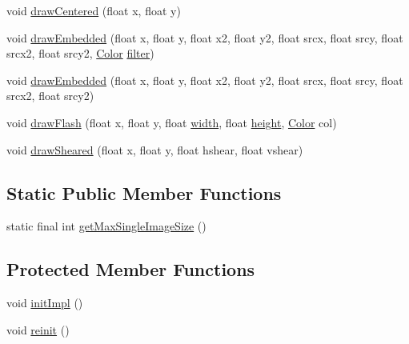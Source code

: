 \begin{DoxyCompactItemize}
\item 
void \mbox{\hyperlink{classorg_1_1newdawn_1_1slick_1_1_big_image_a22ffb9ca81943b3496bd21acea3c980b}{draw\+Centered}} (float x, float y)
\item 
void \mbox{\hyperlink{classorg_1_1newdawn_1_1slick_1_1_big_image_ad90a19b21edee9f36e8a1b37aaf4f0c4}{draw\+Embedded}} (float x, float y, float x2, float y2, float srcx, float srcy, float srcx2, float srcy2, \mbox{\hyperlink{classorg_1_1newdawn_1_1slick_1_1_color}{Color}} \mbox{\hyperlink{classorg_1_1newdawn_1_1slick_1_1_image_a1c6f09687817420f3762f32bb1c3ed76}{filter}})
\item 
void \mbox{\hyperlink{classorg_1_1newdawn_1_1slick_1_1_big_image_ad878757becbd4a9be288a79fafef6cac}{draw\+Embedded}} (float x, float y, float x2, float y2, float srcx, float srcy, float srcx2, float srcy2)
\item 
void \mbox{\hyperlink{classorg_1_1newdawn_1_1slick_1_1_big_image_af3b4c3e296f8e9b43062cac19f22d09e}{draw\+Flash}} (float x, float y, float \mbox{\hyperlink{classorg_1_1newdawn_1_1slick_1_1_image_a7d02c85e21b388428cfe5cc5c82714a1}{width}}, float \mbox{\hyperlink{classorg_1_1newdawn_1_1slick_1_1_image_a54397a37823bc59ddc79ec70dc5cf226}{height}}, \mbox{\hyperlink{classorg_1_1newdawn_1_1slick_1_1_color}{Color}} col)
\item 
void \mbox{\hyperlink{classorg_1_1newdawn_1_1slick_1_1_big_image_a9d88e551d8e8f9d5ca8e10180d9c47ca}{draw\+Sheared}} (float x, float y, float hshear, float vshear)
\end{DoxyCompactItemize}
\subsection*{Static Public Member Functions}
\begin{DoxyCompactItemize}
\item 
static final int \mbox{\hyperlink{classorg_1_1newdawn_1_1slick_1_1_big_image_a9f630e56a300dc74c6403b290a56c059}{get\+Max\+Single\+Image\+Size}} ()
\end{DoxyCompactItemize}
\subsection*{Protected Member Functions}
\begin{DoxyCompactItemize}
\item 
void \mbox{\hyperlink{classorg_1_1newdawn_1_1slick_1_1_big_image_a49af5bbb03ef5ea49bc3b8933803c3a6}{init\+Impl}} ()
\item 
void \mbox{\hyperlink{classorg_1_1newdawn_1_1slick_1_1_big_image_ac1f5655e3a5bab1619ddd3acbad7da7c}{reinit}} ()
\end{DoxyCompactItemize}
